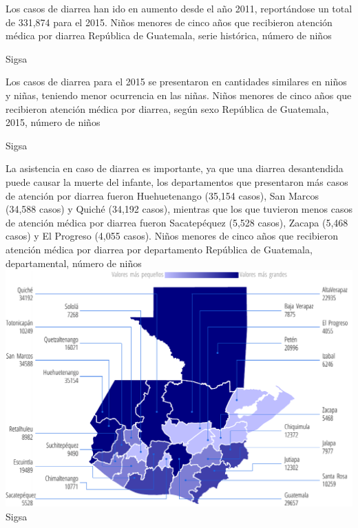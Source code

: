 

%
{%
	Los casos de diarrea han ido en aumento desde el año 2011, reportándose un total de 331,874 para el 2015.
}%
{%
	Niños menores de cinco años que recibieron atención médica por diarrea} %
{%
	República de Guatemala, serie histórica, número de niños} %
{%
	\begin{tikzpicture}[x=1pt,y=1pt]    \end{tikzpicture}}%
{%
	Sigsa} %



%
{%
	Los casos de diarrea para el 2015 se presentaron en cantidades similares en niños y niñas, teniendo menor ocurrencia en las niñas. 
	}%
{%
	Niños menores de cinco años que recibieron atención médica por diarrea, según sexo} %
{%
	República de Guatemala, 2015, número de niños} %
{%
	\begin{tikzpicture}[x=1pt,y=1pt]    \end{tikzpicture}}%
{%
	Sigsa} %



%
{%
	La asistencia en caso de diarrea es importante, ya que una diarrea desantendida puede causar la muerte del infante, los departamentos que presentaron más casos de atención por diarrea fueron Huehuetenango (35,154 casos), San Marcos (34,588 casos) y Quiché (34,192 casos), mientras que los que tuvieron menos casos de atención médica por diarrea fueron Sacatepéquez (5,528 casos), Zacapa (5,468 casos) y El Progreso (4,055 casos). 
}%
{%
	Niños menores de cinco años que recibieron atención médica por diarrea por departamento} %
{%
	República de Guatemala, departamental, número de niños} %
{%
	\includegraphics[width=52\cuadri]{graficas/5_14.pdf}}%
{%
	Sigsa} %


